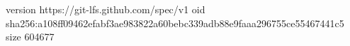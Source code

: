 version https://git-lfs.github.com/spec/v1
oid sha256:a108ff09462efabf3ae983822a60bebc339adb88e9faaa296755ce55467441c5
size 604677
